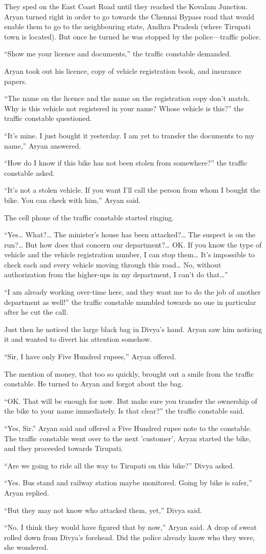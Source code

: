 They sped on the East Coast Road until they reached the Kovalam Junction. Aryan
turned right in order to go towards the Chennai Bypass road that would enable
them to go to the neighbouring state, Andhra Pradesh (where Tirupati town is
located). But once he turned he was stopped by the police—traffic police.

“Show me your licence and documents,” the traffic constable demanded.

Aryan took out his licence, copy of vehicle registration book, and insurance
papers.

“The name on the licence and the name on the registration copy don't match. Why
is this vehicle not registered in your name? Whose vehicle is this?” the traffic
constable questioned.

“It's mine. I just bought it yesterday. I am yet to transfer the documents to my
name,” Aryan answered.

“How do I know if this bike has not been stolen from somewhere?” the traffic
constable asked.

“It's not a stolen vehicle. If you want I'll call the person from whom I bought
the bike. You can check with him,” Aryan said.

The cell phone of the traffic constable started ringing.

“Yes… What?… The minister's house has been attacked?… The suspect is on
the run?… But how does that concern our department?… OK. If you know the
type of vehicle and the vehicle registration number, I can stop them… It's
impossible to check each and every vehicle moving through this road… No,
without authorization from the higher-ups in my department, I can't do that…”

“I am already working over-time here, and they want me to do the job of another
department as well!” the traffic constable mumbled towards no one in particular
after he cut the call.

Just then he noticed the large black bag in Divya's hand. Aryan saw him noticing
it and wanted to divert his attention somehow.

“Sir, I have only Five Hundred rupees,” Aryan offered.

The mention of money, that too so quickly, brought out a smile from the traffic
constable. He turned to Aryan and forgot about the bag.

“OK. That will be enough for now. But make sure you transfer the ownership of
the bike to your name immediately. Is that clear?” the traffic constable said.

“Yes, Sir.” Aryan said and offered a Five Hundred rupee note to the constable.
The traffic constable went over to the next 'customer', Aryan started the bike,
and they proceeded towards Tirupati.

“Are we going to ride all the way to Tirupati on this bike?” Divya asked.

“Yes. Bus stand and railway station maybe monitored. Going by bike is safer,”
Aryan replied.

“But they may not know who attacked them, yet,” Divya said.

“No. I think they would have figured that by now,” Aryan said. A drop of sweat
rolled down from Divya's forehead. Did the police already know who they were,
she wondered.